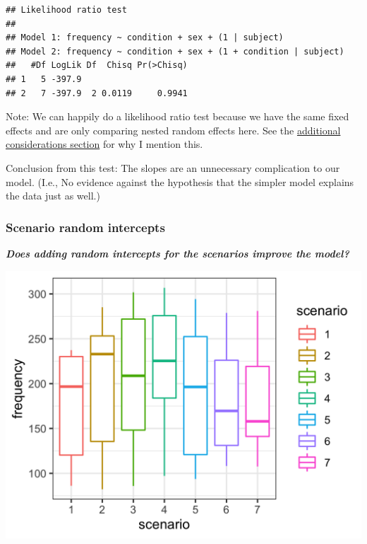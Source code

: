 \documentclass[
  openany]{book}
\begin{document}
\begin{verbatim}
## Likelihood ratio test
## 
## Model 1: frequency ~ condition + sex + (1 | subject)
## Model 2: frequency ~ condition + sex + (1 + condition | subject)
##   #Df LogLik Df  Chisq Pr(>Chisq)
## 1   5 -397.9                     
## 2   7 -397.9  2 0.0119     0.9941
\end{verbatim}

Note: We can happily do a likelihood ratio test because we have the same fixed effects and are only comparing nested random effects here. See the \protect\hyperlink{reml}{additional considerations section} for why I mention this.

Conclusion from this test: The slopes are an unnecessary complication to our model. (I.e., No evidence against the hypothesis that the simpler model explains the data just as well.)

\hypertarget{scenario-random-intercepts}{%
\subsubsection{Scenario random intercepts}\label{scenario-random-intercepts}}

\textbf{\emph{Does adding random intercepts for the scenarios improve the model?}}

\includegraphics[width=16.67in]{images/m3/scen_int}
\end{document}

